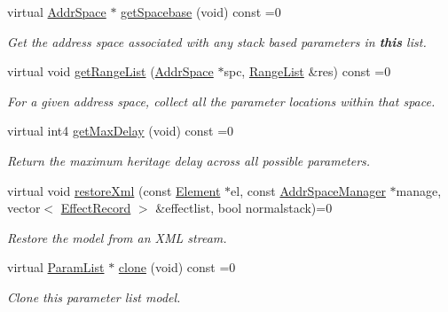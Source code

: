 \begin{DoxyCompactItemize}
virtual \mbox{\hyperlink{class_addr_space}{Addr\+Space}} $\ast$ \mbox{\hyperlink{class_param_list_ae42fc70d73e1143e5dad67766e413f05}{get\+Spacebase}} (void) const =0
\begin{DoxyCompactList}\small\item\em Get the address space associated with any stack based parameters in {\bfseries{this}} list. \end{DoxyCompactList}\item 
virtual void \mbox{\hyperlink{class_param_list_a35f41fbd1143cba10bd81cd5a81ad476}{get\+Range\+List}} (\mbox{\hyperlink{class_addr_space}{Addr\+Space}} $\ast$spc, \mbox{\hyperlink{class_range_list}{Range\+List}} \&res) const =0
\begin{DoxyCompactList}\small\item\em For a given address space, collect all the parameter locations within that space. \end{DoxyCompactList}\item 
virtual int4 \mbox{\hyperlink{class_param_list_af3d5640d0912fca118219d8213ed3a28}{get\+Max\+Delay}} (void) const =0
\begin{DoxyCompactList}\small\item\em Return the maximum heritage delay across all possible parameters. \end{DoxyCompactList}\item 
virtual void \mbox{\hyperlink{class_param_list_a886a9ff1081a2cdcfdaec5c45b5f7f29}{restore\+Xml}} (const \mbox{\hyperlink{class_element}{Element}} $\ast$el, const \mbox{\hyperlink{class_addr_space_manager}{Addr\+Space\+Manager}} $\ast$manage, vector$<$ \mbox{\hyperlink{class_effect_record}{Effect\+Record}} $>$ \&effectlist, bool normalstack)=0
\begin{DoxyCompactList}\small\item\em Restore the model from an X\+ML stream. \end{DoxyCompactList}\item 
virtual \mbox{\hyperlink{class_param_list}{Param\+List}} $\ast$ \mbox{\hyperlink{class_param_list_ac6ab0a8bc1ea2e7f84a5148c6be721d8}{clone}} (void) const =0
\begin{DoxyCompactList}\small\item\em Clone this parameter list model. \end{DoxyCompactList}\end{DoxyCompactItemize}


